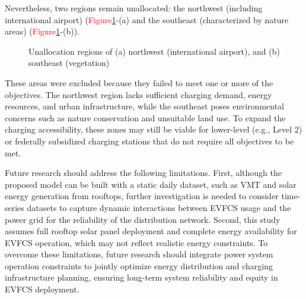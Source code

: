 \documentclass[preprint,12pt]{elsarticle}
\begin{document}
Nevertheless, two regions remain unallocated: the northwest (including international airport) (\textcolor{red}{Figure}\ref{fig:urns}-(a) and the southeast (characterized by nature areas) (\textcolor{red}{Figure}\ref{fig:urns}-(b)). 

\begin{figure}[h]
    \centering
    \qquad

    \captionsetup{format=plain, font=small, labelfont=bf}
    \caption{Unallocation regions of (a) northwest (international airport), and (b) southeast (vegetation)}
    \label{fig:urns}
\end{figure}

These areas were excluded because they failed to meet one or more of the objectives. The northwest region lacks sufficient charging demand, energy resources, and urban infrastructure, while the southeast poses environmental concerns such as nature conservation and unsuitable land use. To expand the charging accessibility, these zones may still be viable for lower-level (e.g., Level 2) or federally subsidized charging stations that do not require all objectives to be met. 

\vspace{0.5cm}

Future research should address the following limitations. First, although the proposed model can be built with a static daily dataset, such as VMT and solar energy generation from rooftops, further investigation is needed to consider time-series datasets to capture dynamic interactions between EVFCS usage and the power grid for the reliability of the distribution network. Second, this study assumes full rooftop solar panel deployment and complete energy availability for EVFCS operation, which may not reflect realistic energy constraints. To overcome these limitations, future research should integrate power system operation constraints to jointly optimize energy distribution and charging infrastructure planning, ensuring long-term system reliability and equity in EVFCS deployment.  
\end{document}
